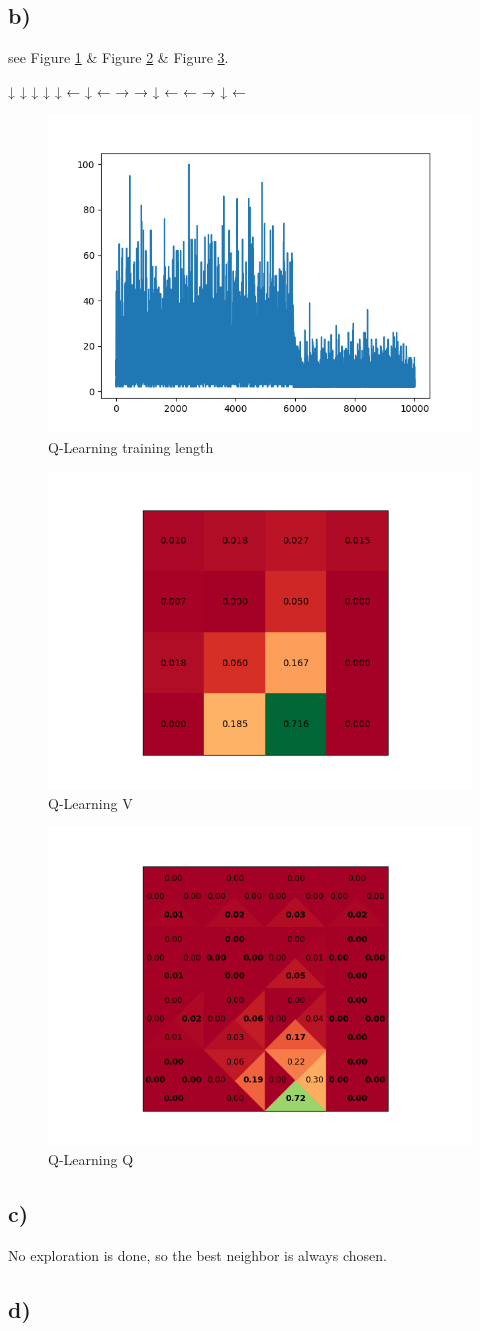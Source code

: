 \documentclass[a4paper]{article}
\begin{document}
\subsection*{b)}
see Figure \ref{fig:qlearnlength} \& Figure \ref{fig:qlearnreward} \& Figure \ref{fig:qlearnpolicy}.

↓ ↓ ↓ ↓
↓ ← ↓ ←
→ → ↓ ←
← → ↓ ←

\begin{figure}
	\centering
	\includegraphics[width=0.8\linewidth]{4x4_qlearn_length}
	\caption{Q-Learning training length}
	\label{fig:qlearnlength}
\end{figure}
\begin{figure}
	\centering
	\includegraphics[width=0.6\linewidth]{4x4_qlearn_v}
	\caption{Q-Learning V}
	\label{fig:qlearnreward}
\end{figure}
\begin{figure}
	\centering
	\includegraphics[width=0.6\linewidth]{4x4_qlearn_q}
	\caption{Q-Learning Q}
	\label{fig:qlearnpolicy}
\end{figure}

\subsection*{c)}

No exploration is done, so the best neighbor is always chosen.

\subsection*{d)}
\end{document}
